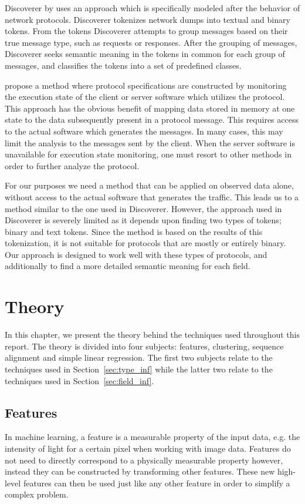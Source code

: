 \documentclass[a4paper]{report}
\begin{document}
Discoverer by \citet{cui07} uses an approach which is specifically modeled
after the behavior of network protocols. Discoverer tokenizes
network dumps into textual and binary tokens. From the tokens Discoverer
attempts to group messages based on their true message type, such as requests
or responses. After the grouping of messages, Discoverer seeks semantic meaning
in the tokens in common for each group of messages, and classifies the tokens
into a set of predefined classes.

\citet{caballero12} propose a method where protocol specifications are
constructed by monitoring the execution state of the client or server software
which utilizes the protocol. This approach has the obvious benefit of mapping
data stored in memory at one state to the data subsequently present in a
protocol message. This requires access to the actual software which generates
the messages. In many cases, this may limit the analysis to the messages sent by
the client. When the server software is unavailable for execution state
monitoring, one must resort to other methods in order to further analyze the
protocol.

For our purposes we need a method that can be applied on observed data alone,
without access to the actual software that generates the traffic. This leads us
to a method similar to the one used in Discoverer. However, the approach used
in Discoverer is severely limited as it depends upon finding two types of
tokens; binary and text tokens. Since the method is based on the results of
this tokenization, it is not suitable for protocols that are mostly or entirely
binary. Our approach is designed to work well with these types of protocols,
and additionally to find a more detailed semantic meaning for each field.

\chapter{Theory}
In this chapter, we present the theory behind the techniques used throughout
this report. The theory is divided into four subjects: features, clustering,
sequence alignment and simple linear regression. The first two subjects relate
to the techniques used in Section~\ref{sec:type_inf} while the latter two
relate to the techniques used in Section~\ref{sec:field_inf}.

\section{Features}
In machine learning, a feature is a measurable property of the input data, e.g.
the intensity of light for a certain pixel when working with image data.
Features do not need to directly correspond to a physically measurable property
however, instead they can be constructed by transforming other features. These
new high-level features can then be used just like any other feature in order
to simplify a complex problem.
\end{document}
